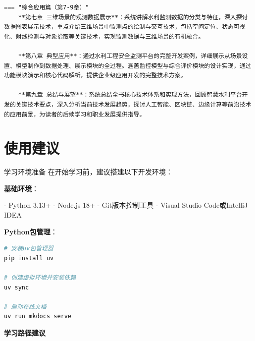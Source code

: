 \begin{verbatim}
=== "综合应用篇（第7-9章）"
    **第七章 三维场景的观测数据展示**：系统讲解水利监测数据的分类与特征，深入探讨数据图表展示技术，重点介绍三维场景中监测点的绘制与交互技术，包括空间定位、状态可视化、射线检测与对象拾取等关键技术，实现监测数据与三维场景的有机融合。
    
    **第八章 典型应用**：通过水利工程安全监测平台的完整开发案例，详细展示从场景设置、模型制作到数据处理、展示模块的全过程。涵盖监控模型与综合评价模块的设计实现，通过功能模块演示和核心代码解析，提供企业级应用开发的完整技术方案。
    
    **第九章 总结与展望**：系统总结全书核心技术体系和实现方法，回顾智慧水利平台开发的关键技术要点，深入分析当前技术发展趋势，探讨人工智能、区块链、边缘计算等前沿技术的应用前景，为读者的后续学习和职业发展提供指导。
\end{verbatim}

\section{使用建议}

 学习环境准备 在开始学习前，建议搭建以下开发环境：

\begin{tcolorbox}[colback=green!5!white,colframe=green!75!black,title=环境配置要求]
\textbf{基础环境}：

- Python 3.13+ 
- Node.js 18+
- Git版本控制工具
- Visual Studio Code或IntelliJ IDEA

\textbf{Python包管理}：

\begin{lstlisting}[language=bash]
# 安装uv包管理器
pip install uv

# 创建虚拟环境并安装依赖
uv sync

# 启动在线文档
uv run mkdocs serve
\end{lstlisting}
\end{tcolorbox}

\textbf{学习路径建议}

